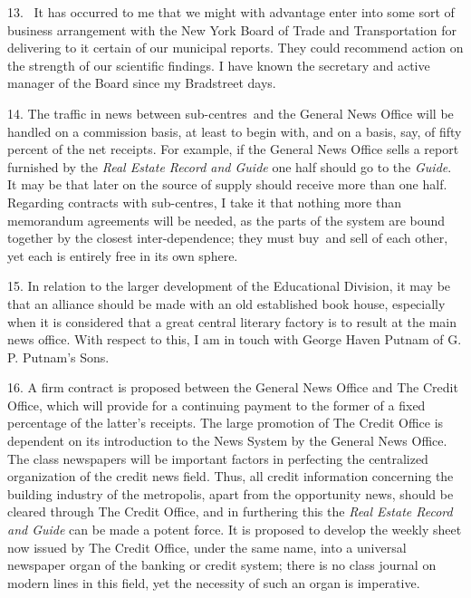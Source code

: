 \documentclass[twoside,symmetric,nobib,justified]{tufte-book}
\begin{document}
13.~ It has occurred to me that we might with advantage enter into some
sort of business arrangement with the New York Board of Trade and
Transportation for delivering to it certain of our municipal reports.
They could recommend action on the strength of our scientific findings.
I have known the secretary and active manager of the Board since my
Bradstreet days.~

14. The traffic in news between sub-centres~and the General News Office
will be handled on a commission basis, at least to begin with, and on a
basis, say, of fifty percent of the net receipts. For example, if the
General News Office sells a report furnished by the \emph{Real Estate
Record and Guide} one half should go to the \emph{Guide}. It may be that
later on the source of supply should receive more than one half.
Regarding contracts with sub-centres, I take it that nothing more than
memorandum agreements will be needed, as the parts of the system are
bound together by the closest inter-dependence; they must buy~and sell
of each other, yet each is entirely free in its own sphere.~

15. In relation to the larger development of the Educational Division,
it may be that an alliance should be made with an old established book
house, especially when it is considered that a great central literary
factory is to result at the main news office. With respect to this, I am
in touch with George Haven Putnam of G. P. Putnam's Sons.~

16. A firm contract is proposed between the General News Office and The
Credit Office, which will provide for a continuing payment to the former
of a fixed percentage of the latter's receipts. The large promotion of
The Credit Office is dependent on its introduction to the News System by
the General News Office. The class newspapers will be important factors
in perfecting the centralized organization of the credit news field.
Thus, all credit information concerning the building industry of the
metropolis, apart from the opportunity news, should be cleared through
The Credit Office, and in furthering this the \emph{Real Estate Record
and Guide} can be made a potent force. It is proposed to develop the
weekly sheet now issued by The Credit Office, under the same name, into
a universal newspaper organ of the banking or credit system; there is no
class journal on modern lines in this field, yet the necessity of such
an organ is imperative.~
\end{document}
